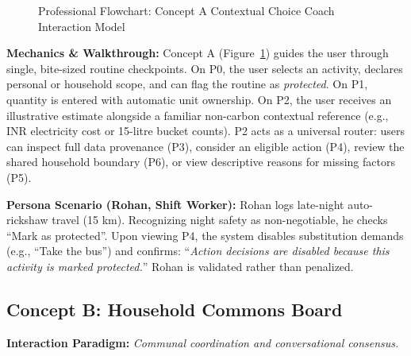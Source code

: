 \documentclass[12pt,a4paper]{article}
\begin{document}
\begin{figure}[ht]
\caption{Professional Flowchart: Concept A Contextual Choice Coach Interaction Model}
\label{fig:concept_a_flow}
\end{figure}

\textbf{Mechanics \& Walkthrough:} Concept A (Figure~\ref{fig:concept_a_flow}) guides the user through single, bite-sized routine checkpoints. On P0, the user selects an activity, declares personal or household scope, and can flag the routine as \emph{protected}. On P1, quantity is entered with automatic unit ownership. On P2, the user receives an illustrative estimate alongside a familiar non-carbon contextual reference (e.g., INR electricity cost or 15-litre bucket counts). P2 acts as a universal router: users can inspect full data provenance (P3), consider an eligible action (P4), review the shared household boundary (P6), or view descriptive reasons for missing factors (P5).

\textbf{Persona Scenario (Rohan, Shift Worker):} Rohan logs late-night auto-rickshaw travel (15 km). Recognizing night safety as non-negotiable, he checks ``Mark as protected''. Upon viewing P4, the system disables substitution demands (e.g., ``Take the bus'') and confirms: ``\emph{Action decisions are disabled because this activity is marked protected.}'' Rohan is validated rather than penalized.

\subsection{Concept B: Household Commons Board}
\textbf{Interaction Paradigm:} \emph{Communal coordination and conversational consensus.}
\end{document}
